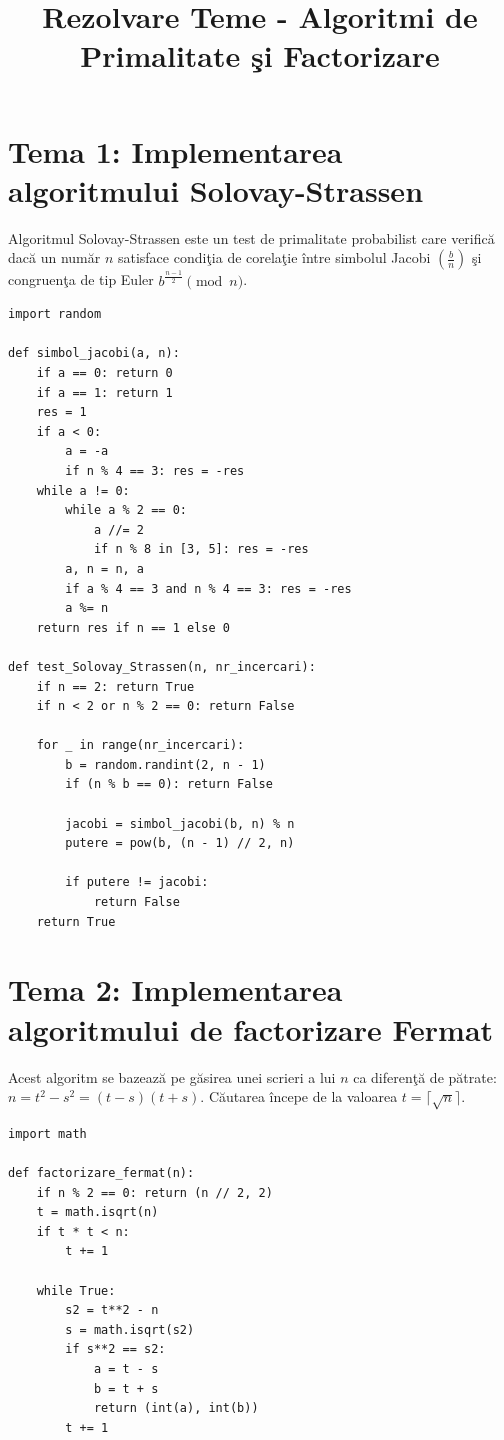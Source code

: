 \documentclass[12pt, a4paper]{article}
\title{Rezolvare Teme - Algoritmi de Primalitate \c{s}i Factorizare}
\author{}
\date{}
\begin{document}
\maketitle

\section*{Tema 1: Implementarea algoritmului Solovay-Strassen}

Algoritmul Solovay-Strassen este un test de primalitate probabilist care verific\u{a} dac\u{a} un num\u{a}r $n$ satisface condi\c{t}ia de corela\c{t}ie \^{i}ntre simbolul Jacobi $\left(\frac{b}{n}\right)$ \c{s}i congruen\c{t}a de tip Euler $b^{\frac{n-1}{2}} \pmod n$.

\begin{lstlisting}
import random

def simbol_jacobi(a, n):
    if a == 0: return 0
    if a == 1: return 1
    res = 1
    if a < 0:
        a = -a
        if n % 4 == 3: res = -res
    while a != 0:
        while a % 2 == 0:
            a //= 2
            if n % 8 in [3, 5]: res = -res
        a, n = n, a
        if a % 4 == 3 and n % 4 == 3: res = -res
        a %= n
    return res if n == 1 else 0

def test_Solovay_Strassen(n, nr_incercari):
    if n == 2: return True
    if n < 2 or n % 2 == 0: return False
    
    for _ in range(nr_incercari):
        b = random.randint(2, n - 1)
        if (n % b == 0): return False 
        
        jacobi = simbol_jacobi(b, n) % n
        putere = pow(b, (n - 1) // 2, n)
        
        if putere != jacobi:
            return False
    return True
\end{lstlisting}

\vspace{0.5cm}

\section*{Tema 2: Implementarea algoritmului de factorizare Fermat}

Acest algoritm se bazeaz\u{a} pe g\u{a}sirea unei scrieri a lui $n$ ca diferen\c{t}\u{a} de p\u{a}trate: $n = t^2 - s^2 = (t-s)(t+s)$. C\u{a}utarea \^{i}ncepe de la valoarea $t = \lceil\sqrt{n}\rceil$.

\begin{lstlisting}
import math

def factorizare_fermat(n):
    if n % 2 == 0: return (n // 2, 2)
    t = math.isqrt(n)
    if t * t < n:
        t += 1
        
    while True:
        s2 = t**2 - n
        s = math.isqrt(s2)
        if s**2 == s2:
            a = t - s
            b = t + s
            return (int(a), int(b))
        t += 1
\end{lstlisting}
\end{document}
